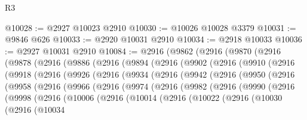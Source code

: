 \begin{lexlean}{R3}
\begin{coremodule}
@10028 := @2927 @10023 @2910
@10030 := @10026 @10028 @3379
@10031 := @9846 @626
@10033 := @2920 @10031 @2910
@10034 := @2918 @10033
@10036 := @2927 @10031 @2910
@10084 := @2916
    (@9862
      (@2916
        (@9870
          (@2916
            (@9878
              (@2916
                (@9886
                  (@2916
                    (@9894
                      (@2916
                        (@9902
                          (@2916
                            (@9910
                              (@2916
                                (@9918
                                  (@2916
                                    (@9926
                                      (@2916
                                        (@9934
                                          (@2916
                                            (@9942
                                              (@2916
                                                (@9950
                                                  (@2916
                                                    (@9958
                                                      (@2916
                                                        (@9966
                                                          (@2916
                                                            (@9974
                                                              (@2916
                                                                (@9982
                                                                  (@2916
                                                                    (@9990
                                                                      (@2916
                                                                        (@9998
                                                                          (@2916
                                                                            (@10006
                                                                              (@2916
                                                                                (@10014
                                                                                  (@2916
                                                                                    (@10022
                                                                                      (@2916
                                                                                        (@10030
                                                                                          (@2916
                                                                                            (@10034

\end{coremodule}
\end{lexlean}
